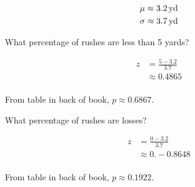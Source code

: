 \documentclass[landscape]{exam}
\begin{document}
  \begin{align*}
    \mu    & \approx \unit[3.2]{yd} \\
    \sigma & \approx \unit[3.7]{yd} \\
  \end{align*}

  \begin{questions}
    \question{} What percentage of rushes are less than 5 yards?
      \begin{solution}
        \begin{align*}
          z & = \frac{5 - 3.2}{3.7} \\
            & \approx 0.4865 \\
        \end{align*}

        From table in back of book, $p \approx 0.6867$.
      \end{solution}

    \question{} What percentage of rushes are losses?
      \begin{solution}
        \begin{align*}
          z & = \frac{0 - 3.2}{3.7} \\
            & \approx 0.-0.8648 \\
        \end{align*}

        From table in back of book, $p \approx 0.1922$.
      \end{solution}

  \end{questions}



\end{document}
